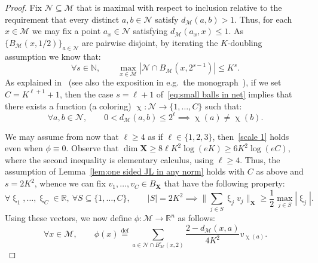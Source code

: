 \documentclass[11pt,reqno]{amsart}
\newcommand{\R}{\mathbb{R}}
\newcommand{\N}{\mathbb{N}}
\renewcommand{\le}{\leqslant}
\renewcommand{\ge}{\geqslant}
\renewcommand{\subset}{\subseteq}
\newcommand{\eqdef}{\stackrel{\mathrm{def}}{=}}
\newcommand{\X}{\mathbf X}
\newcommand{\NN}{\mathcal{N}}
\newcommand{\MM}{\mathcal{M}}
\newcommand{\1}{\mathbf{1}}
\begin{document}
\begin{proof} Fix $\NN\subset \MM$ that is maximal with respect to inclusion relative to the requirement that every distinct $a,b\in \NN$ satisfy $d_\MM(a,b)>1$. Thus, for each $x\in \MM$ we may fix a point $a_x\in \NN$ satisfying $d_\MM(a_x,x)\le 1$.   As $\{B_\MM(x,1/2)\}_{a\in \NN}$ are pairwise disjoint, by iterating the $K$-doubling assumption we know that: 
\begin{equation}\label{eq:small balls in net}
\forall s\in \N,\qquad \max_{x\in \MM}|\NN\cap B_\MM(x,2^{s-1})|\le K^{s}.
\end{equation}
As explained in~\cite{Assouad} (see also the exposition in e.g.~the monograph~\cite[Chapter~12]{Hei01}), if we set $C= K^{\ell+1}+1$, then the case $s=\ell+1$ of~\eqref{eq:small balls in net} implies that there exists a function (a coloring)  $\upchi:\NN\to \{1,\ldots, C\}$ such that:
\begin{equation}\label{eq:coloring coindition}
\forall a,b\in \NN,\qquad 0<d_\MM(a,b)\le 2^{\ell}\implies \upchi(a)\neq\upchi(b). 
\end{equation}


We may assume from now that $\ell\ge 4$ as if $\ell\in \{1,2,3\}$, then~\eqref{scale 1} holds even when  $\phi\equiv 0$.  Observe that $\dim\X\ge 8\ell K^2\log(eK)\ge 6K^2\log(eC)$, where the second inequality is elementary calculus, using $\ell\ge 4$. Thus,  the assumption of Lemma~\ref{lem:one sided JL in any norm} holds with $C$ as above and  $s=2K^2$, whence we can fix $v_1,\ldots,v_C\in B_\X$  that have the following property:
\begin{equation}\label{eq:super 1/2 bessel}
\forall \upxi_1,\ldots,\upxi_C\in \R,\ \forall S\subset \{1,\ldots,C\},\qquad |S|=2K^2\implies \Big\|\sum_{j\in S} \upxi_j v_j\Big\|_\X\ge \frac12 \max_{j\in S}|\upxi_j|. 
\end{equation}
Using these vectors, we  now define  $\phi:\MM \to \R^n$ as follows:
\begin{equation}\label{eq:def our f_i}
\forall x\in \MM,\qquad \phi(x)\eqdef  \sum_{a\in \NN\cap B_\MM^\circ(x,2)} \frac{2-d_\MM(x,a)}{4K^2} v_{\upchi(a)}.
\end{equation}



\end{proof}
\end{document}

